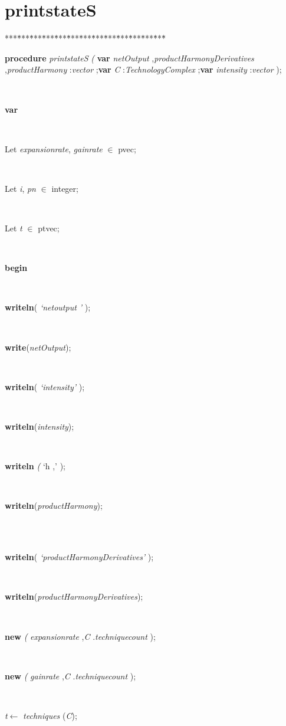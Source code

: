 \section{printstateS}\label{sec:harmonyprintstateS}

\begin{tabbing}
***\=***\=***\=***\=***\=***\=***\=***\=***\=***\=***\=***\=***\=\kill
\parbox{14cm}{\textsf{\textbf{procedure}  \textit{printstateS} \textit{(} \textbf{var}  \textit{netOutput} ,\textit{productHarmonyDerivatives} ,\textit{productHarmony} :\textit{vector} ;\textbf{var}  \textit{C} :\textit{TechnologyComplex}  ;\textbf{var}  \textit{intensity} :\textit{vector} );}}\\
\+\parbox{14cm}{\textsf{\textbf{var} }}\\
\parbox{14cm}{\textsf{Let \textit{expansionrate}, \textit{gainrate} $\in$ pvec;}}\\
\parbox{14cm}{\textsf{Let \textit{i}, \textit{pn} $\in$ integer;}}\\
\parbox{14cm}{\textsf{Let \textit{t} $\in$ ptvec;}}\\
\-\<\+\parbox{14cm}{\textsf{\textbf{begin} }}\\
\parbox{14cm}{\textsf{\textbf{writeln}(\textit{\textrm{\textup { `netoutput  ' } }})}; }\\
\parbox{14cm}{\textsf{\textbf{write}(\textit{netOutput})}; }\\
\parbox{14cm}{\textsf{\textbf{writeln}(\textit{\textrm{\textup { `intensity' } }})}; }\\
\parbox{14cm}{\textsf{\textbf{writeln}(\textit{intensity})}; }\\
\parbox{14cm}{\textsf{\textbf{writeln} \textit{(} \textrm{\textup { `h ,' } });}}\\
\parbox{14cm}{\textsf{\textbf{writeln}(\textit{productHarmony})}; }\\
\\
\parbox{14cm}{\textsf{\textbf{writeln}(\textit{\textrm{\textup { `productHarmonyDerivatives' } }})}; }\\
\parbox{14cm}{\textsf{\textbf{writeln}(\textit{productHarmonyDerivatives})}; }\\
\parbox{14cm}{\textsf{\textbf{new} \textit{(}  \textit{expansionrate} ,\textit{C} .\textit{techniquecount} );}}\\
\parbox{14cm}{\textsf{\textbf{new} \textit{(} \textit{gainrate} ,\textit{C} .\textit{techniquecount} );}}\\
\parbox{14cm}{\textsf{\textit{t}$\leftarrow$ \textit{techniques} (\textit{C})}; }\\

\end{tabbing}

